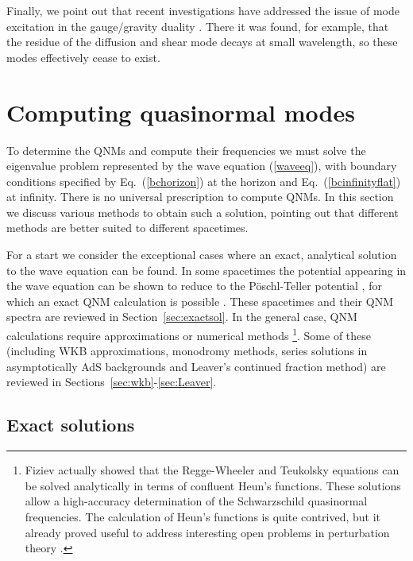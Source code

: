 \documentclass[]{iopart}
\begin{document}
Finally, we point out that recent investigations have addressed the issue of
mode excitation in the gauge/gravity duality
\cite{Amado:2008ji,Amado:2007yr}. There it was found, for example, that the
residue of the diffusion and shear mode decays at small wavelength, so these
modes effectively cease to exist.

\section{\label{methodsqnm}Computing quasinormal modes}

To determine the QNMs and compute their frequencies we must solve the
eigenvalue problem represented by the wave equation (\ref{waveeq}), with
boundary conditions specified by Eq.~(\ref{bchorizon}) at the horizon and
Eq.~(\ref{bcinfinityflat}) at infinity. There is no universal prescription to
compute QNMs.  In this section we discuss various methods to obtain such a
solution, pointing out that different methods are better suited to different
spacetimes.

For a start we consider the exceptional cases where an exact, analytical
solution to the wave equation can be found.  In some spacetimes the potential
appearing in the wave equation can be shown to reduce to the P\"oschl-Teller
potential \cite{poschlteller}, for which an exact QNM calculation is possible
\cite{Ferrari:1984zz}. These spacetimes and their QNM spectra are reviewed in
Section~\ref{sec:exactsol}. In the general case, QNM calculations require
approximations or numerical methods
%
\footnote{Fiziev \cite{Fiziev:2005ki,Fiziev:2009kh} actually showed that the
  Regge-Wheeler and Teukolsky equations can be solved analytically in terms of
  confluent Heun's functions. These solutions allow a high-accuracy
  determination of the Schwarzschild quasinormal frequencies. The calculation
  of Heun's functions is quite contrived, but it already proved useful to
  address interesting open problems in perturbation theory
  \cite{Borissov:2009bj,Fiziev:2009ud}.}.
%
Some of these (including WKB approximations, monodromy methods, series
solutions in asymptotically AdS backgrounds and Leaver's continued fraction
method) are reviewed in Sections~\ref{sec:wkb}-\ref{sec:Leaver}.

\subsection{\label{sec:exactsol}Exact solutions}
\end{document}
